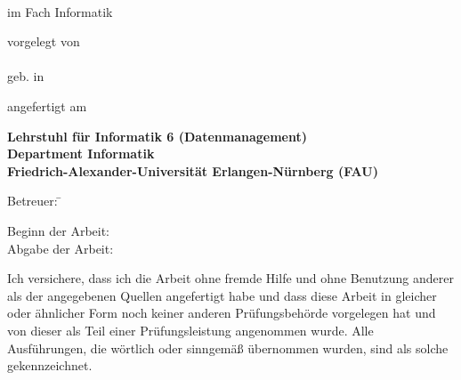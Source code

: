 \begin{titlepage}

  \begin{center}
    
    {\Huge \bfseries
      \thesistitle{}\\
    } 
    
    \vspace*{1cm}
    \thethesis{} im Fach Informatik
    \vspace{2cm}
    
    {\large vorgelegt von} \\
    \vspace*{0.7cm}
    {\Large \bfseries \myname} \\
    \vspace*{0.7cm}
    {\large geb. \birthday{} in \birthplace{}} 
    
    \vspace{1.5cm}
    
    angefertigt am 

    \vspace{1cm}
    
    {\bfseries
      Lehrstuhl für Informatik 6 (Datenmanagement) \\
      Department Informatik \\
      Friedrich-Alexander-Universität Erlangen-Nürnberg (FAU)\\
      }
    
    \vspace{0.5cm}
\end{center}
\begin{tabbing}
    Betreuer: \= \corrector{}\\
    \> \tutor{} 
\end{tabbing}
    \vspace{0.25cm}
    
\begin{tabbing}
  Beginn der Arbeit: \startofwork{} \\
  Abgabe der Arbeit: \dayofdoom{}
\end{tabbing}

\end{titlepage}
%
\cleardoubleemptypage
%
%
Ich versichere, dass ich die Arbeit ohne fremde Hilfe und ohne Benutzung
anderer als der angegebenen Quellen angefertigt habe und dass diese Arbeit in
gleicher oder ähnlicher Form noch keiner anderen Prüfungsbehörde
vorgelegen hat und von dieser als Teil einer Prüfungsleistung angenommen
wurde. Alle Ausführungen, die wörtlich oder sinngemäß übernommen
wurden, sind als solche gekennzeichnet.

